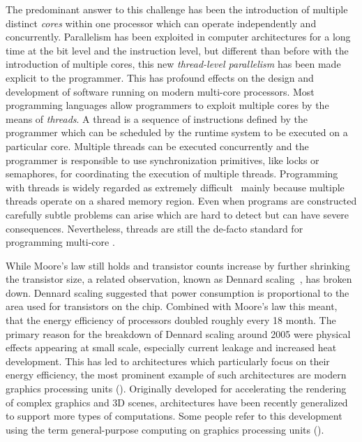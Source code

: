 The predominant answer to this challenge has been the introduction of multiple distinct \emph{cores} within one processor which can operate independently and concurrently.
Parallelism has been exploited in computer architectures for a long time at the bit level and the instruction level, but different than before with the introduction of multiple cores, this new \emph{thread-level parallelism} has been made explicit to the programmer.
This has profound effects on the design and development of software running on modern multi-core processors.
Most programming languages allow programmers to exploit multiple cores by the means of \emph{threads}.
A thread is a sequence of instructions defined by the programmer which can be scheduled by the runtime system to be executed on a particular core.
Multiple threads can be executed concurrently and the programmer is responsible to use synchronization primitives, like locks or semaphores, for coordinating the execution of multiple threads.
Programming with threads is widely regarded as extremely difficult~\cite{Lee06} mainly because multiple threads operate on a shared memory region.
Even when programs are constructed carefully subtle problems can arise which are hard to detect but can have severe consequences.
Nevertheless, threads are still the de-facto standard for programming multi-core \CPUs.

\bigskip

\noindent
While Moore's law still holds and transistor counts increase by further shrinking the transistor size, a related observation, known as Dennard scaling~\cite{DennardRiBaLe1974}, has broken down.
Dennard scaling suggested that power consumption is proportional to the area used for transistors on the chip.
Combined with Moore's law this meant, that the energy efficiency of processors doubled roughly every 18 month.
The primary reason for the breakdown of Dennard scaling around 2005 were physical effects appearing at small scale, especially current leakage and increased heat development.
This has led to architectures which particularly focus on their energy efficiency, the most prominent example of such architectures are modern graphics processing units (\GPUs).
Originally developed for accelerating the rendering of complex graphics and 3D scenes, \GPU architectures have been recently generalized to support more types of computations.
Some people refer to this development using the term general-purpose computing on graphics processing units (\GPGPU).


